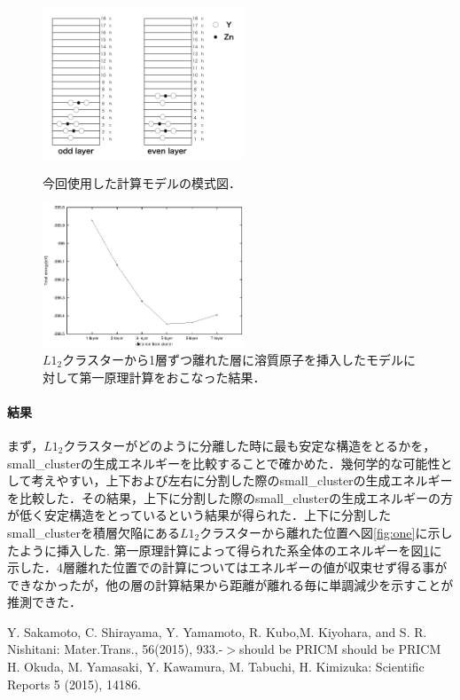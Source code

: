 \documentclass[12pt, a4paper]{jarticle}
\newcommand{\講演番号}
{14pPSA-18}
\newcommand{\講演題目}
{Mg-LPSOのL\mbox{\boldmath $1_2$} クラスターの第一原理計算}
\newcommand{\英文題目}
{First principle calculations of L12 Cluster in Mg-Zn-Y alloy}
\newcommand{\和文所属}
{関西学院大・理工}
\newcommand{\和文氏名}
{西谷滋人, 清原資之, 森下慎也}
\newcommand{\英文所属}
{Department of Informatics, Kwansei Gakuin Univ}
\newcommand{\英文氏名}
{S. R. Nishitani, M. Kiyohara, S. Morishita}
\newlength\題目幅
\newlength\ヘッダ項目間隔
\newlength\所属インデント
\newlength\和文氏名インデント
\newlength\英文氏名インデント
\newlength\最小所属氏名間隔
\newlength\ヘッダ行間隔
\newlength\本文行間隔
\newlength\上端余白
\newlength\左端余白
\begin{document}
\begin{figure}[H]
 \begin{minipage}{0.5\hsize}
  \begin{center}
   \includegraphics[width=60mm]{./small_cluster_slab.png}
  \end{center}
  \caption{今回使用した計算モデルの模式図．}
  \label{fig:one}
 \end{minipage}
 \begin{minipage}{0.5\hsize}
  \begin{center}
   \includegraphics[width=60mm]{./small_cluster.eps}
  \end{center}
  \caption{$L1_2$クラスターから1層ずつ離れた層に溶質原子を挿入したモデルに対して第一原理計算をおこなった結果．}
  \label{fig:two}
 \end{minipage}
\end{figure}

\vspace{-1.3\baselineskip}
\paragraph{結果}
まず，$L1_2$クラスターがどのように分離した時に最も安定な構造をとるかを，small\_clusterの生成エネルギーを比較することで確かめた．幾何学的な可能性として考えやすい，上下および左右に分割した際のsmall\_clusterの生成エネルギーを比較した．その結果，上下に分割した際のsmall\_clusterの生成エネルギーの方が低く安定構造をとっているという結果が得られた．上下に分割したsmall\_clusterを積層欠陥にある$L1_2$クラスターから離れた位置へ図\ref{fig:one}に示したように挿入した. 第一原理計算によって得られた系全体のエネルギーを図\ref{fig:two}に示した．4層離れた位置での計算についてはエネルギーの値が収束せず得る事ができなかったが，他の層の計算結果から距離が離れる毎に単調減少を示すことが推測できた．

{\small\setlength\baselineskip{10pt}	%
\begin{thebibliography}{9}
Y. Sakamoto, C. Shirayama, Y. Yamamoto, R. Kubo,M. Kiyohara, and S. R. Nishitani: Mater.Trans., 56(2015), 933.-$>$should be PRICM
 should be PRICM
H. Okuda, M. Yamasaki, Y. Kawamura, M. Tabuchi, H. Kimizuka: Scientific Reports 5 (2015), 14186.
\end{thebibliography}
}
\end{document}
